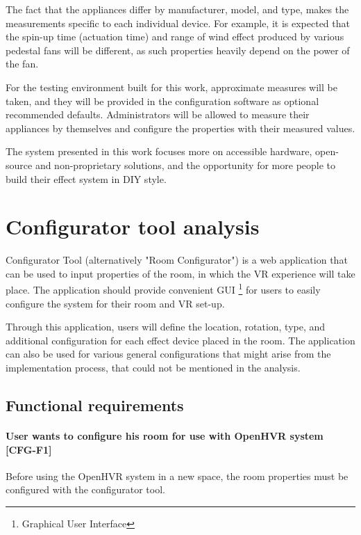 The fact that the appliances differ by manufacturer, model, and type,
makes the measurements specific to each individual device.
For example, it is expected that the spin-up time
(actuation time) and range of wind effect produced by various pedestal fans
will be different, as such properties heavily depend on the power of the fan.


For the testing environment built for this work, approximate measures will be
taken, and they will be provided in the configuration software as optional
recommended defaults. Administrators will be allowed
to measure their appliances by themselves and configure the properties with
their measured values.


The system presented in this work focuses more
on accessible hardware, open-source and non-proprietary solutions, and
the opportunity for more people to build their effect system in DIY style.


\hypertarget{x-configurator-tool-analysis}{\section{Configurator tool analysis}}
Configurator Tool (alternatively "Room Configurator") is a web application that
can be used to
input properties of the room, in which the VR experience will take place.
The application should provide convenient GUI \footnote{Graphical User Interface}
for users to easily configure the system for their room and VR set-up.


Through this application, users will define the location, rotation, type, and
additional configuration for each effect device placed in the room. The application
can also be used for various general configurations that might arise from
the implementation process, that could not be mentioned in the analysis.


\hypertarget{x-functional-requirements}{\subsection{Functional requirements}}
\hypertarget{x-\textbf{user-wants-to-configure-his-room-for-use-with-openhvr-system}-[cfg-f1]}{\paragraph*{\textbf{User wants to configure his room for use with OpenHVR system} [CFG-F1]}}
Before using the OpenHVR system in a new space,
the room properties must be configured with the configurator tool.


